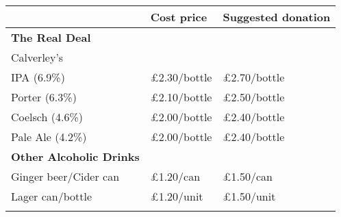 \documentclass[a4paper,12pt]{article}
\begin{document}
\large
\begin{center}

\def\arraystretch{1.1}

\begin{tabular}{p{7.5cm}p{3cm}p{3cm}} & \textbf{Cost price} & \textbf{Suggested donation} \\
\hline

\textbf{The Real Deal} & & \\
Calverley's & \\ %
\qquad IPA (6.9\%)      & \pounds 2.30/bottle & \pounds 2.70/bottle \\
\qquad Porter (6.3\%)   & \pounds 2.10/bottle & \pounds 2.50/bottle \\
\qquad Coelsch (4.6\%)  & \pounds 2.00/bottle & \pounds 2.40/bottle \\
\qquad Pale Ale (4.2\%) & \pounds 2.00/bottle & \pounds 2.40/bottle \\
\medskip

\textbf{Other Alcoholic Drinks} & & \\
Ginger beer/Cider can & \pounds 1.20/can & \pounds 1.50/can \\
Lager can/bottle & \pounds 1.20/unit & \pounds 1.50/unit \\
\medskip


\end{tabular}
\end{center}
\end{document}
